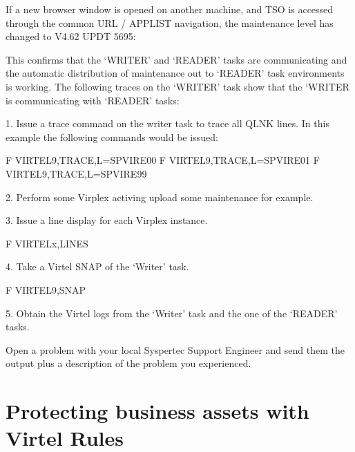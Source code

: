\documentclass[letterpaper,10pt,english]{sphinxmanual}
\begin{document}
\sphinxAtStartPar
{}

\sphinxAtStartPar
If a new browser window is opened on another machine, and TSO is accessed through the common URL / APPLIST navigation, the maintenance level has changed to V4.62 UPDT 5695:\sphinxhyphen{}

\sphinxAtStartPar
{}

\sphinxAtStartPar
This confirms that the ‘WRITER’ and ‘READER’ tasks are communicating and the automatic distribution of maintenance out to ‘READER’ task environments is working. The following traces on the ‘WRITER’ task show that the ‘WRITER is communicating with ‘READER’ tasks:\sphinxhyphen{}

\sphinxAtStartPar
{}

\ignorespaces 
\sphinxAtStartPar
{}

\begin{sphinxVerbatim}[commandchars=\\\{\}]
1.  Issue a trace command on the writer task to trace all QLNK lines. In this example the following commands would be issued:\PYGZhy{}

F VIRTEL9,TRACE,L=SPVIRE00
F VIRTEL9,TRACE,L=SPVIRE01
F VIRTEL9,TRACE,L=SPVIRE99


2.  Perform some Virplex activing \textendash{} upload some maintenance for example.

3.  Issue a line display for each Virplex instance.

F VIRTELx,LINES

4.  Take a Virtel SNAP of the ‘Writer’ task.

F VIRTEL9,SNAP

5.  Obtain the Virtel logs from the ‘Writer’ task and the one of the ‘READER’ tasks.

Open a problem with your local Syspertec Support Engineer and send them the output plus a description of the problem you experienced.
\end{sphinxVerbatim}

\ignorespaces 

\chapter{Protecting business assets with Virtel Rules}
\label{\detokenize{connectivity_guide:protecting-business-assets-with-virtel-rules}}\label{\detokenize{connectivity_guide:index-193}}
\end{document}
